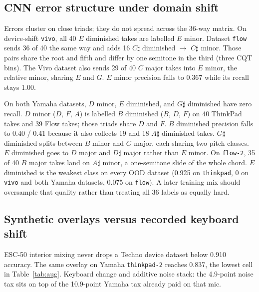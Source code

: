 \documentclass[pdflatex,sn-mathphys-num,iicol]{sn-jnl}
\theoremstyle{thmstyleone}
\theoremstyle{thmstyletwo}
\theoremstyle{thmstylethree}
\begin{document}
\subsection{CNN error structure under domain shift}\label{subsec5_1}

Errors cluster on close triads; they do not spread across the 36-way matrix. On device-shift \texttt{vivo}, all 40 $E$ diminished takes are labelled $E$ minor. Dataset \texttt{flow} sends 36 of 40 the same way and adds 16 $C\sharp$ diminished $\to$ $C\sharp$ minor. Those pairs share the root and fifth and differ by one semitone in the third (three CQT bins). The Vivo dataset also sends 29 of 40 $C$ major takes into $E$ minor, the relative minor, sharing $E$ and $G$. $E$ minor precision falls to 0.367 while its recall stays 1.00.

On both Yamaha datasets, $D$ minor, $E$ diminished, and $G\sharp$ diminished have zero recall. $D$ minor ($D$, $F$, $A$) is labelled $B$ diminished ($B$, $D$, $F$) on 40 ThinkPad takes and 39 Flow takes; those triads share $D$ and $F$. $B$ diminished precision falls to 0.40 / 0.41 because it also collects 19 and 18 $A\sharp$ diminished takes. $G\sharp$ diminished splits between $B$ minor and $G$ major, each sharing two pitch classes. $E$ diminished goes to $D$ major and $D\sharp$ major rather than $E$ minor. On \texttt{flow-2}, 35 of 40 $B$ major takes land on $A\sharp$ minor, a one-semitone slide of the whole chord. $E$ diminished is the weakest class on every OOD dataset (0.925 on \texttt{thinkpad}, 0 on \texttt{vivo} and both Yamaha datasets, 0.075 on \texttt{flow}). A later training mix should oversample that quality rather than treating all 36 labels as equally hard.

\subsection{Synthetic overlays versus recorded keyboard shift}\label{subsec5_2}

ESC-50 interior mixing never drops a Techno device dataset below 0.910 accuracy. The same overlay on Yamaha \texttt{thinkpad-2} reaches 0.837, the lowest cell in Table~\ref{tab:aug}. Keyboard change and additive noise stack: the 4.9-point noise tax sits on top of the 10.9-point Yamaha tax already paid on that mic.
\end{document}

